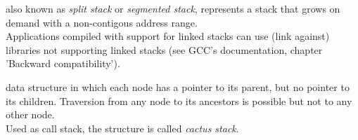 also known as \emph{split stack}\cite{gccsplit} or
\emph{segmented stack}\cite{llvmseg}, represents a stack that grows on demand
with a non-contigous address range.\\
Applications compiled with support for linked stacks can use (link against)
libraries not supporting linked stacks (see GCC's documentation\cite{gccsplit},
chapter 'Backward compatibility').

data structure in which each node has a pointer to its parent, but no pointer to
its children. Traversion from any node to its ancestors is possible but not to
any other node.\\
Used as call stack, the structure is called \emph{cactus stack}.
